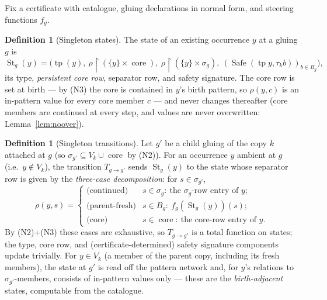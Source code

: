 \documentclass[11pt]{article}
\theoremstyle{definition}
\newtheorem{definition}[theorem]{Definition}
\newcommand{\tp}{\operatorname{tp}}
\newcommand{\Safe}{\operatorname{Safe}}
\newcommand{\St}{\operatorname{St}}
\newcommand{\core}{\operatorname{core}}
\begin{document}
Fix a certificate with catalogue, gluing declarations in normal form,
and steering functions $f_g$.

\begin{definition}[Singleton states]\label{def:single}
The state of an existing occurrence $y$ at a gluing $g$ is
\[
\St_g(y)=\bigl(\tp(y),\ \rho\restriction(\{y\}\times\core),\
\rho\restriction(\{y\}\times\sigma_g),\
(\Safe(\tp y,\tau_k b))_{b\in B_g}\bigr),
\]
its type, \emph{persistent core row}, separator row, and safety
signature.  The core row is set at birth --- by (N3) the core is
contained in $y$'s birth pattern, so $\rho(y,c)$ is an in-pattern value
for every core member $c$ --- and never changes thereafter (core
members are continued at every step, and values are never overwritten:
Lemma~\ref{lem:noover}).
\end{definition}

\begin{definition}[Singleton transitions]\label{def:trans}
Let $g'$ be a child gluing of the copy $k$ attached at $g$ (so
$\sigma_{g'}\subseteq V_k\cup\core$ by (N2)).  For an occurrence $y$
ambient at $g$ (i.e.\ $y\notin V_k$), the transition
$T_{g\to g'}$ sends $\St_g(y)$ to the state whose separator row is
given by the \emph{three-case decomposition}: for $s\in\sigma_{g'}$,
\[
\rho(y,s)=
\begin{cases}
\text{(continued)} & s\in\sigma_g:\ \text{the } \sigma_g\text{-row
entry of } y;\\
\text{(parent-fresh)} & s\in B_g:\ f_g(\St_g(y))(s);\\
\text{(core)} & s\in\core:\ \text{the core-row entry of } y.
\end{cases}
\]
By (N2)+(N3) these cases are exhaustive, so $T_{g\to g'}$ is a total
function on states; the type, core row, and (certificate-determined)
safety signature components update trivially.  For $y\in V_k$ (a
member of the parent copy, including its fresh members), the state at
$g'$ is read off the pattern network and, for $y$'s relations to
$\sigma_{g'}$-members, consists of in-pattern values only --- these are
the \emph{birth-adjacent} states, computable from the catalogue.
\end{definition}
\end{document}
